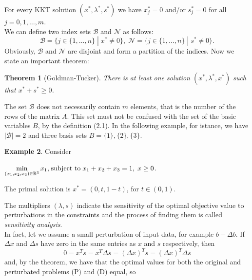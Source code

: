 \documentclass[a4paper,10 pt,titlepage,twoside]{book}
\theoremstyle{plain}
\newtheorem{thm}{Theorem}[chapter]
\theoremstyle{definition}
\newtheorem{ex}[thm]{Example}
\theoremstyle{remark}
\begin{document}
For every KKT solution $(x^{*}, \lambda^{*}, s^{*})$ we have $x_{j}^{*}= 0$ and/or $s_{j}^{*}= 0$ for all $j=0,1,\dots,m$.\\
We can define two index sets $\mathcal{B}$ and $\mathcal{N}$ as follows:
\begin{equation}\label{index}
\mathcal{B} =\{j\in\{1,\dots,n\}\;|\; x^{*} \not= 0\}, \;
\mathcal{N} =\{j\in\{1,\dots,n\}\;|\; s^{*} \not= 0\}.
\end{equation}  
Obviously, $\mathcal{B}$ and $\mathcal{N}$ are disjoint and form a partition of the indices. Now we state an important theorem:
\begin{thm}[Goldman-Tucker]
	There is at least one solution $(x^{*}, \lambda^{*}, x^{*})$ such that $x^{*}+s^{*}\geq0$.
\end{thm}
The set $\mathcal{B}$ does not necessarily contain $m$ elements, that is the number of the rows of the matrix $A$. This set must not be confused with the set of the basic variables $B$, by the definition (2.1). In the following example, for istance, we have $|\mathcal{B}|= 2$ and three basis sets $B = \{1\}, \{2\}, \{3\}$.
\begin{ex}
Consider
\begin{center} $\min\limits_{(x_{1},x_{2},x_{3})\in\mathbb{R}^{3}} x_{1} \text{,\;subject to\;} x_{1}+x_{2}+x_{3} = 1,\; x\geq 0$.\end{center}
The primal solution is $x^{*}=(0, t, 1-t)$, for $t\in(0,1)$. 	
\end{ex} 

The multipliers $(\lambda,s)$ indicate the sensitivity of the optimal objective value  to perturbations in the constraints and the process of finding them is called \textit{sensitivity analysis}. \\ In fact, let we assume a small perturbation of input data, for example $b + \Delta b$. If $\Delta x$ and $\Delta s$ have zero in the same entries as $x$ and $s$ respectively, then
\begin{equation*}
0=x^{T}s=x^{T}\Delta s= \left( \Delta x\right)^{T}s=\left( \Delta x\right)^{T}\Delta s
\end{equation*}
and, by the theorem, we have that the optimal values for both the original and perturbated problems (P) and (D) equal, so
\end{document}
